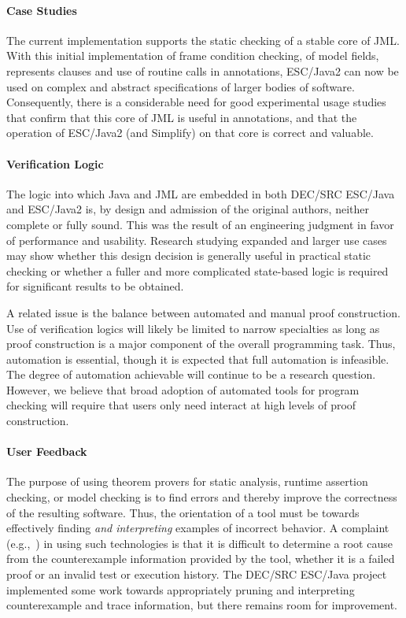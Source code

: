 \documentclass{llncs}
\begin{document}
\paragraph*{Case Studies} The current implementation supports the
static checking of a stable core of JML.  With this initial
implementation of frame condition checking, of model fields,
represents clauses and use of routine calls in annotations, ESC/Java2
can now be used on complex and abstract specifications of larger
bodies of software.  Consequently, there is a considerable need for
good experimental usage studies that confirm that this core of JML is
useful in annotations, and that the operation of ESC/Java2 (and
Simplify) on that core is correct and valuable.

\paragraph*{Verification Logic} The logic into which Java and JML are
embedded in both DEC/SRC ESC/Java and ESC/Java2 is, by design and
admission of the original authors, neither complete or fully sound.
This was the result of an engineering judgment in favor of performance
and usability.  Research studying expanded and larger use cases may
show whether this design decision is generally useful in practical
static checking or whether a fuller and more complicated state-based
logic is required for significant results to be obtained.

A related issue is the balance between automated and manual proof
construction.  Use of verification logics will likely be limited to
narrow specialties as long as proof construction is a major component
of the overall programming task.  Thus, automation is essential,
though it is expected that full automation is infeasible.  The degree
of automation achievable will continue to be a research question.
However, we believe that broad adoption of automated tools for program
checking will require that users only need interact at high levels of
proof construction.

\paragraph*{User Feedback} The purpose of using theorem provers for
static analysis, runtime assertion checking, or model checking is to
find errors and thereby improve the correctness of the resulting
software.  Thus, the orientation of a tool must be towards effectively
finding \emph{and interpreting} examples of incorrect behavior.  A
complaint (e.g.,~\cite{GroceVisser03}) in using such technologies is
that it is difficult to determine a root cause from the counterexample
information provided by the tool, whether it is a failed proof or an
invalid test or execution history.  The DEC/SRC ESC/Java project
implemented some work towards appropriately pruning and interpreting
counterexample and trace information, but there remains room for
improvement.
\end{document}
